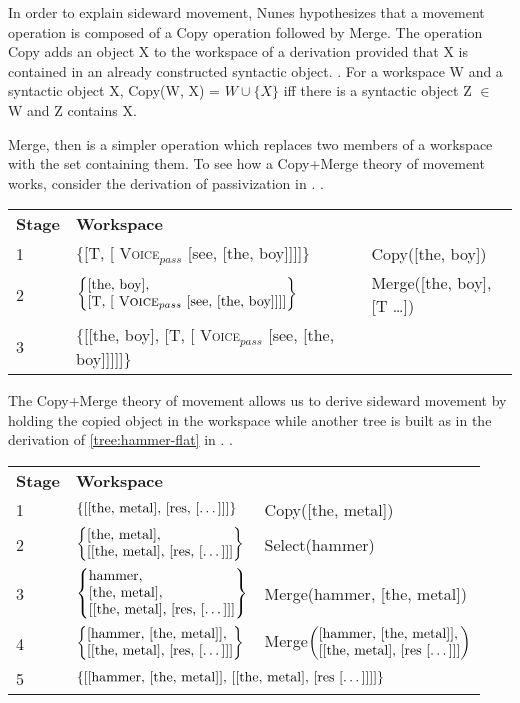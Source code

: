 \documentclass[MilwayThesis]{subfiles}
\begin{document}
In order to explain sideward movement, Nunes hypothesizes that a movement operation is composed of a Copy operation followed by Merge.
The operation Copy adds an object X to the workspace of a derivation provided that X is contained in an already constructed syntactic object.
\ex. For a workspace W and a syntactic object X, Copy(W, X) = $W\cup \{X\}$ iff there is a syntactic object Z $\in$ W and Z contains X.

Merge, then is a simpler operation which replaces two members of a workspace with the set containing them. 
To see how a Copy+Merge theory of movement works, consider the derivation of passivization in \Next.
\ex. 
\begin{tabular}[t]{lll}
	\textbf{Stage} & \textbf{Workspace} & \\
	\cline{1-2}
	1 & $\{$[T, [ \textsc{Voice}$_{pass}$ [see, [the, boy]]]]$\}$ & Copy([the, boy])\\
	2 & $
		\begin{Bmatrix*}[l]
			\text{[the, boy]},\\
			\text{[T, [ \textsc{Voice}$_{pass}$ [see, [the, boy]]]]}
		\end{Bmatrix*}
		$ & Merge([the, boy], [T \ldots])\\
	3 & $\{$[[the, boy], [T, [ \textsc{Voice}$_{pass}$ [see, [the, boy]]]]]$\}$ &\\
\end{tabular}

The Copy+Merge theory of movement allows us to derive sideward movement by holding the copied object in the workspace while another tree is built as in the derivation of \ref{tree:hammer-flat} in \Next.
\ex.
\begin{tabular}[t]{lll}
	\textbf{Stage} & \textbf{Workspace} & \\
	\cline{1-2}
	1 & $\left\{ \text{[[the, metal], [res, [\dots]]]} \right\}$ & Copy([the, metal])\\
	2 & $
	\begin{Bmatrix*}[l]
		\text{[the, metal]},\\
		\text{[[the, metal], [res, [\dots]]]}
	\end{Bmatrix*}
	$ & Select(hammer)\\
	3 & $
	\begin{Bmatrix*}[l]
		\text{hammer},\\
		\text{[the, metal]},\\
		\text{[[the, metal], [res, [\dots]]]}
	\end{Bmatrix*}
	$ & Merge(hammer, [the, metal])\\
	4 & $
	\begin{Bmatrix*}[l]
		\text{[hammer, [the, metal]]},\\
		\text{[[the, metal], [res, [\dots]]]}
	\end{Bmatrix*}
	$ & Merge$\begin{pmatrix*}[l]\text{[hammer, [the, metal]]},\\ \text{[[the, metal], [res [\dots]]]}\end{pmatrix*}$\\
	5 & \multicolumn{2}{l}{$\left\{\text{[[hammer, [the, metal]], [[the, metal], [res [\dots]]]]}\right\}$}\\
\end{tabular}
\end{document}
